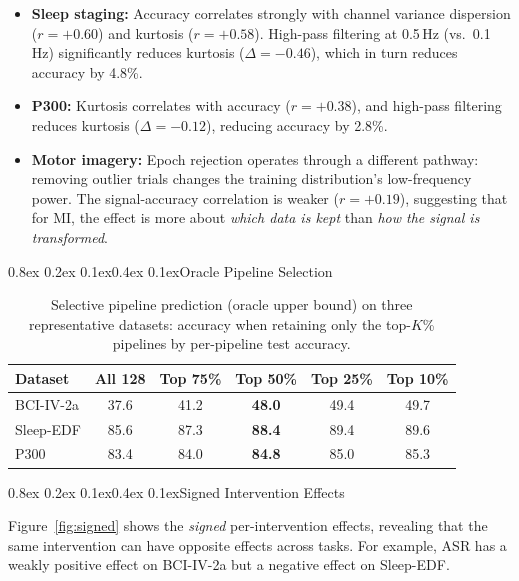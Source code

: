 \documentclass{article}
\makeatletter
\renewcommand{\subsection}{\@startsection{subsection}{2}{\z@}%
  {0.8ex \@plus 0.2ex \@minus 0.1ex}{0.4ex \@plus 0.1ex}{\normalsize\bf}}
\makeatother
\begin{document}
\begin{itemize}
    \item \textbf{Sleep staging:} Accuracy correlates strongly with channel variance dispersion ($r{=}+0.60$) and kurtosis ($r{=}+0.58$). High-pass filtering at 0.5\,Hz (vs.\ 0.1\,Hz) significantly reduces kurtosis ($\Delta{=}-0.46$), which in turn reduces accuracy by 4.8\%.
    \item \textbf{P300:} Kurtosis correlates with accuracy ($r{=}+0.38$), and high-pass filtering reduces kurtosis ($\Delta{=}-0.12$), reducing accuracy by 2.8\%.
    \item \textbf{Motor imagery:} Epoch rejection operates through a different pathway: removing outlier trials changes the training distribution's low-frequency power. The signal-accuracy correlation is weaker ($r{=}+0.19$), suggesting that for MI, the effect is more about \emph{which data is kept} than \emph{how the signal is transformed}.
\end{itemize}

\subsection{Oracle Pipeline Selection}

\begin{table}[h]
\centering
\caption{Selective pipeline prediction (oracle upper bound) on three representative datasets: accuracy when retaining only the top-$K$\% pipelines by per-pipeline test accuracy.}
\label{tab:selective}
\small
\begin{tabular}{@{}lccccc@{}}
\toprule
Dataset & All 128 & Top 75\% & Top 50\% & Top 25\% & Top 10\% \\
\midrule
BCI-IV-2a & 37.6 & 41.2 & \textbf{48.0} & 49.4 & 49.7 \\
Sleep-EDF & 85.6 & 87.3 & \textbf{88.4} & 89.4 & 89.6 \\
P300 & 83.4 & 84.0 & \textbf{84.8} & 85.0 & 85.3 \\
\bottomrule
\end{tabular}
\end{table}

\subsection{Signed Intervention Effects}

Figure~\ref{fig:signed} shows the \emph{signed} per-intervention effects, revealing that the same intervention can have opposite effects across tasks. For example, ASR has a weakly positive effect on BCI-IV-2a but a negative effect on Sleep-EDF.
\end{document}
